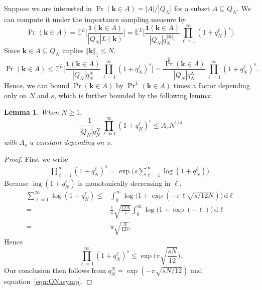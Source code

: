 \documentclass{article}
\newtheorem{lemma}{Lemma}
\theoremstyle{definition}
\renewcommand{\leq}{\leqslant}
\renewcommand{\geq}{\geqslant}
\newcommand{\bsk}{\boldsymbol{k}}
\newcommand{\bsone}{\boldsymbol{1}}
\newcommand{\rd}{\,\mathrm{d}}
\newcommand{\e}{\mathbb{E}}
\begin{document}
Suppose we are interested in $\Pr(\bsk\in A)=|A|/|Q_N|$ for a subset $A\subseteq Q_N$.  We can compute it under the importance sampling measure by
\begin{equation}\label{eqn:PrtoEL}
    \Pr(\bsk\in A)=\e^L\Big[\frac{\bsone(\bsk\in A)}{|Q_N|L(\bsk)}\Big]=\e^L\Big[\frac{\bsone(\bsk\in A)}{|Q_N|q_N^{\Vert\bsk\Vert_1}}\prod_{\ell=1}^\infty (1+q_N^\ell)^s\Big].
\end{equation}
Since $\bsk\in A \subseteq Q_N$ implies $\Vert\bsk\Vert_1\leq N$,
\begin{equation}\label{eqn:PrlePrL}
    \Pr(\bsk\in A)\leq \e^L\Big[\frac{\bsone(\bsk\in A)}{|Q_N|q_N^{N}}\prod_{\ell=1}^\infty (1+q_N^\ell)^s\Big]= \frac{{\textstyle\Pr}^L(\bsk\in A)}{|Q_N|q_N^N}\prod_{\ell=1}^\infty (1+q_N^\ell)^s.
\end{equation}
Hence, we can bound $\Pr(\bsk\in A)$ by ${\textstyle\Pr}^L(\bsk\in A)$ times a factor depending only on $N$ and $s$, which is further bounded by the following lemma:
\begin{lemma}\label{lem:likehoodratio} 
When $N\geq 1$,
    $$\frac{1}{|Q_N|q_N^N}\prod_{\ell=1}^\infty (1+q_N^\ell)^s\leq A_s N^{1/4}$$
    with $A_s$ a constant depending on $s$.
\end{lemma}
\begin{proof}
    First we write
    \begin{align*}
        \prod_{\ell=1}^\infty (1+q_N^\ell)^s=\exp\Big(s\sum_{\ell=1}^\infty \log(1+q^\ell_N)\Big).
    \end{align*}
    Because $\log(1+q^\ell_N)$ is monotonically decreasing in $\ell$, 
    \begin{align*}
        \sum_{\ell=1}^\infty \log(1+q^\ell_N)\leq&\int_0^\infty \log\Big(1+\exp(-\pi\ell\sqrt{s/12N})\Big)\rd \ell\\
        =&\frac{1}{\pi}\sqrt{\frac{12N}{s}}\int_0^\infty \log\Big(1+\exp(-\ell)\Big)\rd \ell\\
        =&\pi\sqrt{\frac{N}{12s}}.
    \end{align*}
    Hence
    \begin{equation*}
        \prod_{\ell=1}^\infty (1+q_N^\ell)^s\leq \exp\Big(\pi\sqrt{\frac{sN}{12}}\Big).
    \end{equation*}
    Our conclusion then follows from $q^N_N=\exp(-\pi\sqrt{sN/12})$ and equation~\eqref{eqn:QNasymp}.
\end{proof}
\end{document}
